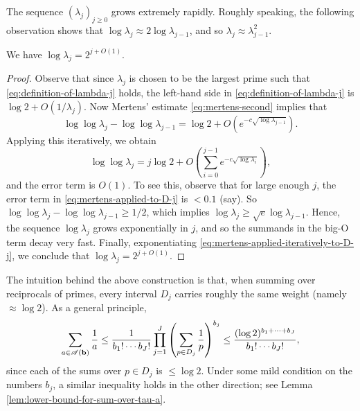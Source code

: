 The sequence $(\lambda_j)_{j \ge 0}$ grows extremely rapidly. Roughly speaking, the following observation shows that $\log \lambda_j \approx 2 \log \lambda_{j - 1}$, and so $\lambda_j \approx \lambda_{j - 1}^2$.
\begin{observation}
    We have $\log \lambda_j = 2^{j + O(1)}$.
\end{observation}
\begin{proof}
    Observe that since $\lambda_j$ is chosen to be the largest prime such that \eqref{eq:definition-of-lambda-j} holds, the left-hand side in \eqref{eq:definition-of-lambda-j} is $\log 2 + O(1/\lambda_j)$.
    Now Mertens' estimate \eqref{eq:mertens-second} implies that
    \begin{equation} \label{eq:mertens-applied-to-D-j}
        \log \log \lambda_j - \log \log \lambda_{j - 1} = \log 2+ O\left( e^{-c \sqrt{\log \lambda_{j - 1}}} \right).
    \end{equation}
    Applying this iteratively, we obtain
    \begin{equation} \label{eq:mertens-applied-iteratively-to-D-j}
        \log \log \lambda_j = j \log 2 + O\left(\sum \limits_{i = 0}^{j - 1} e^{-c \sqrt{\log \lambda_{i}}} \right),
    \end{equation}
    and the error term is $O(1)$. 
    To see this, observe that for large enough $j$, the error term in \eqref{eq:mertens-applied-to-D-j} is $< 0.1$ (say). So $\log \log \lambda_{j} - \log \log \lambda_{j - 1} \ge 1/2$, which implies $\log \lambda_j \ge \sqrt{e} \log \lambda_{j - 1}$.
    Hence, the sequence $\log \lambda_{j}$ grows exponentially in $j$, and so the summands in the big-O term decay very fast.
    Finally, exponentiating \eqref{eq:mertens-applied-iteratively-to-D-j}, we conclude that $\log \lambda_j  = 2^{j + O(1)}$.
\end{proof}

The intuition behind the above construction is that, when summing over reciprocals of primes, every interval $D_j$ carries roughly the same weight (namely $\approx \log 2$). 
As a general principle, 
\begin{equation*}
    \sum \limits_{a \in \mathscr{A} (\mathbf{b})} \frac{1}{a} \le \frac{1}{b_1! \cdots b_J!} \prod \limits_{j = 1}^J \left( \sum \limits_{p \in D_j} \frac{1}{p} \right)^{b_j} \le \frac{(\log 2)^{b_1 + \dots + b_J}}{b_1 ! \cdots b_J!},
\end{equation*}
since each of the sums over $p \in D_j$ is $\le \log 2$.
Under some mild condition on the numbers $b_j$, a similar inequality holds in the other direction; see Lemma \ref{lem:lower-bound-for-sum-over-tau-a}.

